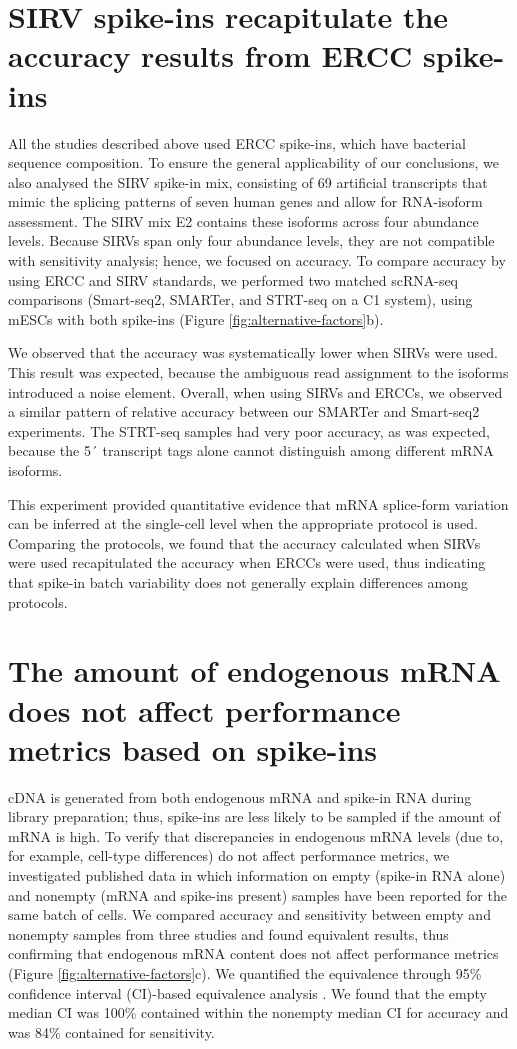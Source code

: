 \section{SIRV spike-ins recapitulate the accuracy results from ERCC spike-ins}

All the studies described above used ERCC spike-ins, which have bacterial sequence composition. To ensure the general applicability of our conclusions, we also analysed the SIRV spike-in mix, consisting of 69 artificial transcripts that mimic the splicing patterns of seven human genes and allow for RNA-isoform assessment. The SIRV mix E2 contains these isoforms across four abundance levels. Because SIRVs span only four abundance levels, they are not compatible with sensitivity analysis; hence, we focused on accuracy. To compare accuracy by using ERCC and SIRV standards, we performed two matched scRNA-seq comparisons (Smart-seq2, SMARTer, and STRT-seq on a C1 system), using mESCs with both spike-ins (Figure \ref{fig:alternative-factors}b).

We observed that the accuracy was systematically lower when SIRVs were used. This result was expected, because the ambiguous read assignment to the isoforms introduced a noise element. Overall, when using SIRVs and ERCCs, we observed a similar pattern of relative accuracy between our SMARTer and Smart-seq2 experiments. The STRT-seq samples had very poor accuracy, as was expected, because the 5´ transcript tags alone cannot distinguish among different mRNA isoforms.

This experiment provided quantitative evidence that mRNA splice-form variation can be inferred at the single-cell level when the appropriate protocol is used. Comparing the protocols, we found that the accuracy calculated when SIRVs were used recapitulated the accuracy when ERCCs were used, thus indicating that spike-in batch variability does not generally explain differences among protocols.

\section{The amount of endogenous mRNA does not affect performance metrics based on spike-ins}

cDNA is generated from both endogenous mRNA and spike-in RNA during library preparation; thus, spike-ins are less likely to be sampled if the amount of mRNA is high. To verify that discrepancies in endogenous mRNA levels (due to, for example, cell-type differences) do not affect performance metrics, we investigated published data in which information on empty (spike-in RNA alone) and nonempty (mRNA and spike-ins present) samples have been reported for the same batch of cells. We compared accuracy and sensitivity between empty and nonempty samples from three studies and found equivalent results, thus confirming that endogenous mRNA content does not affect performance metrics (Figure \ref{fig:alternative-factors}c). We quantified the equivalence through 95\% confidence interval (CI)-based equivalence analysis \cite{Walker2011-qi}. We found that the empty median CI was 100\% contained within the nonempty median CI for accuracy and was 84\% contained for sensitivity.

